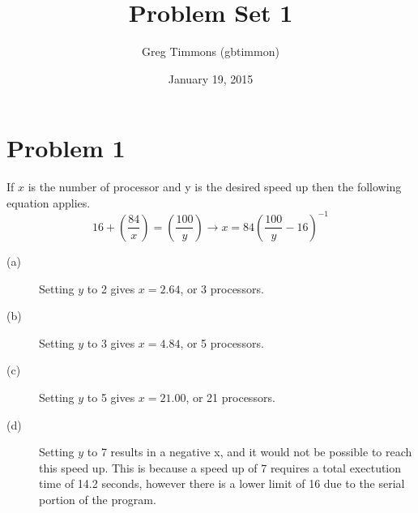 \documentclass{article}
\begin{document}
\title{Problem Set 1}
\author{Greg Timmons (gbtimmon) }
\date{January 19, 2015}
\maketitle
\section{Problem 1}
If $x$ is the number of processor and y is the desired speed up then the following equation applies. 
\[ 16 + (\frac{84}{x}) = (\frac{100}{y}) \rightarrow x = 84(\frac{100}{y} - 16)^{-1}\]
\begin{description}
  \item[(a)] 
  Setting $y$ to 2 gives $x = 2.64$, or 3 processors. 
  \item[(b)]
  Setting $y$ to 3 gives $x = 4.84$, or 5 processors.  
  \item[(c)]
  Setting $y$ to 5 gives $x = 21.00$, or 21 processors. 
  \item[(d)]
  Setting $y$ to 7 results in a negative x, and it would not be possible to reach this speed up. This is because a speed up of 7 requires a total exectution
  time of 14.2 seconds, however there is a lower limit of 16 due to the serial portion of the program. 
\end{description}
\end{document}
